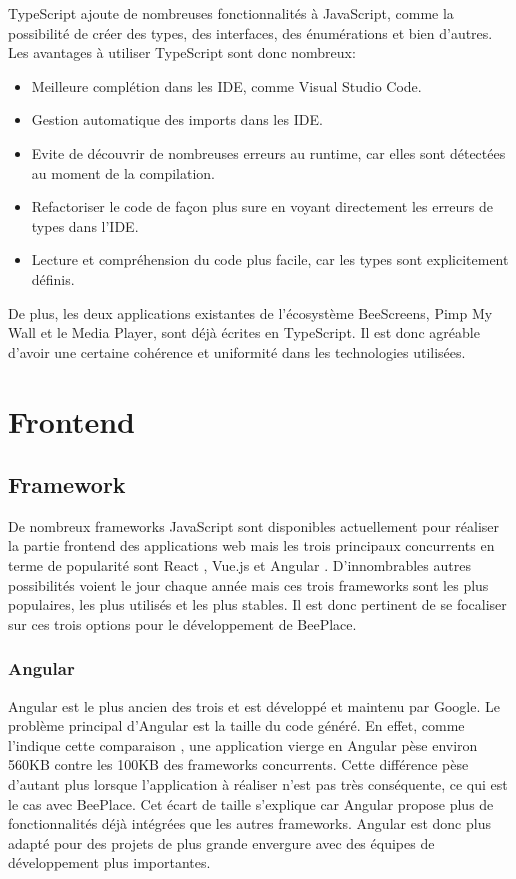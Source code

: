 TypeScript ajoute de nombreuses fonctionnalités à JavaScript, comme la possibilité de créer des types, des interfaces, des énumérations et bien d'autres. Les avantages à utiliser TypeScript sont donc nombreux:

\begin{itemize}
  \item Meilleure complétion dans les IDE, comme Visual Studio Code.
  \item Gestion automatique des imports dans les IDE.
  \item Evite de découvrir de nombreuses erreurs au runtime, car elles sont détectées au moment de la compilation.
  \item Refactoriser le code de façon plus sure en voyant directement les erreurs de types dans l'IDE.
  \item Lecture et compréhension du code plus facile, car les types sont explicitement définis.
\end{itemize}

De plus, les deux applications existantes de l'écosystème BeeScreens, Pimp My Wall et le Media Player, sont déjà écrites en TypeScript. Il est donc agréable d'avoir une certaine cohérence et uniformité dans les technologies utilisées.

\section{Frontend}

\subsection{Framework}

De nombreux frameworks JavaScript sont disponibles actuellement pour réaliser la partie frontend des applications web mais les trois principaux concurrents en terme de popularité sont React \cite{react}, Vue.js \cite{vue} et Angular \cite{angular}. D'innombrables autres possibilités voient le jour chaque année mais ces trois frameworks sont les plus populaires, les plus utilisés et les plus stables. Il est donc pertinent de se focaliser sur ces trois options pour le développement de BeePlace.

\subsubsection{Angular}

Angular est le plus ancien des trois et est développé et maintenu par Google. Le problème principal d'Angular est la taille du code généré. En effet, comme l'indique cette comparaison \cite{comparison-js-frameworks}, une application vierge en Angular pèse environ 560KB contre les 100KB des frameworks concurrents. Cette différence pèse d'autant plus lorsque l'application à réaliser n'est pas très conséquente, ce qui est le cas avec BeePlace. Cet écart de taille s'explique car Angular propose plus de fonctionnalités déjà intégrées que les autres frameworks. Angular est donc plus adapté pour des projets de plus grande envergure avec des équipes de développement plus importantes.

